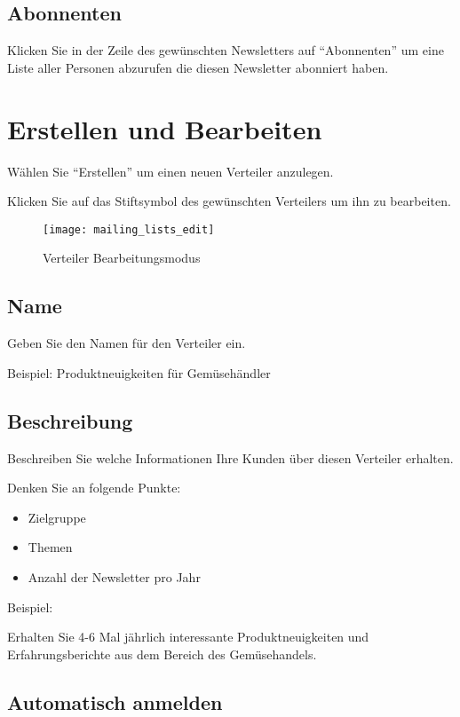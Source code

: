 \documentclass[article, a4paper, oneside, 11pt]{memoir}
\begin{document}
\subsection{Abonnenten}

Klicken Sie in der Zeile des gewünschten Newsletters auf "`Abonnenten"' um eine Liste aller Personen abzurufen die diesen Newsletter abonniert haben.


\section{Erstellen und Bearbeiten}
\label{sec:create-mailing-list}

Wählen Sie "`Erstellen"' um einen neuen Verteiler anzulegen.

Klicken Sie auf das Stiftsymbol des gewünschten Verteilers um ihn zu bearbeiten.

\begin{figure}[htp]
\centering
\texttt{[image: mailing\_lists\_edit]}
\caption{Verteiler Bearbeitungsmodus}
\label{fig:mailing_lists_edit}
\end{figure}


\subsection{Name}

Geben Sie den Namen für den Verteiler ein.

Beispiel: Produktneuigkeiten für Gemüsehändler

\subsection{Beschreibung}

Beschreiben Sie welche Informationen Ihre Kunden über diesen Verteiler erhalten.

Denken Sie an folgende Punkte:
\begin{itemize}
 \item Zielgruppe
 \item Themen
 \item Anzahl der Newsletter pro Jahr
\end{itemize}

Beispiel:  

Erhalten Sie 4-6 Mal jährlich interessante Produktneuigkeiten und Erfahrungsberichte aus dem Bereich des Gemüsehandels.

\subsection{Automatisch anmelden}
\end{document}
